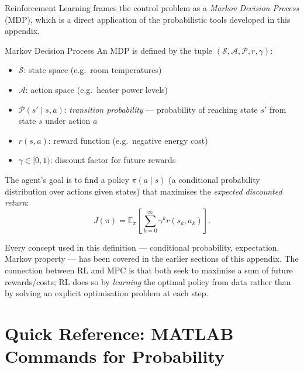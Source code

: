 Reinforcement Learning frames the control problem as a
\emph{Markov Decision Process} (MDP), which is a direct application
of the probabilistic tools developed in this appendix.

\begin{defnbox}{Markov Decision Process}
An MDP is defined by the tuple $(\mathcal{S}, \mathcal{A},
\mathcal{P}, r, \gamma)$:
\begin{itemize}[noitemsep]
  \item $\mathcal{S}$: state space (e.g.\ room temperatures)
  \item $\mathcal{A}$: action space (e.g.\ heater power levels)
  \item $\mathcal{P}(s' \mid s, a)$: \emph{transition probability} —
        probability of reaching state $s'$ from state $s$ under action
        $a$
  \item $r(s,a)$: reward function (e.g.\ negative energy cost)
  \item $\gamma \in [0,1)$: discount factor for future rewards
\end{itemize}
The agent's goal is to find a policy $\pi(a \mid s)$ (a conditional
probability distribution over actions given states) that maximises
the \emph{expected discounted return}:
\[
  J(\pi) = \mathbb{E}_\pi\!\left[\sum_{k=0}^{\infty} \gamma^k r(s_k, a_k)\right].
\]
\end{defnbox}

Every concept used in this definition — conditional probability,
expectation, Markov property — has been covered in the earlier sections
of this appendix.  The connection between RL and MPC is that both seek
to maximise a sum of future rewards/costs; RL does so by
\emph{learning} the optimal policy from data rather than by solving an
explicit optimisation problem at each step.

\section{Quick Reference: MATLAB Commands for Probability}
\label{sec:app_prob_ref}

